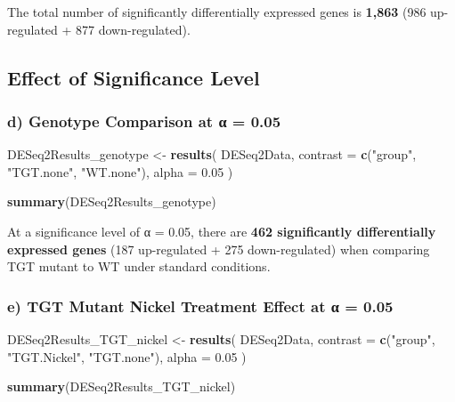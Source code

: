 \documentclass[
  11pt,
]{article}
\newenvironment{Shaded}{\begin{snugshade}}{\end{snugshade}}
\newcommand{\AttributeTok}[1]{\textcolor[rgb]{0.13,0.29,0.53}{#1}}
\newcommand{\FloatTok}[1]{\textcolor[rgb]{0.00,0.00,0.81}{#1}}
\newcommand{\FunctionTok}[1]{\textcolor[rgb]{0.13,0.29,0.53}{\textbf{#1}}}
\newcommand{\NormalTok}[1]{#1}
\newcommand{\OtherTok}[1]{\textcolor[rgb]{0.56,0.35,0.01}{#1}}
\newcommand{\StringTok}[1]{\textcolor[rgb]{0.31,0.60,0.02}{#1}}
\begin{document}
The total number of significantly differentially expressed genes is
\textbf{1,863} (986 up-regulated + 877 down-regulated).

\subsection{Effect of Significance
Level}\label{effect-of-significance-level}

\subsubsection{d) Genotype Comparison at α =
0.05}\label{d-genotype-comparison-at-ux3b1-0.05}

\begin{Shaded}
\begin{Highlighting}[]
\NormalTok{DESeq2Results\_genotype }\OtherTok{\textless{}{-}} \FunctionTok{results}\NormalTok{(}
\NormalTok{  DESeq2Data, }
  \AttributeTok{contrast =} \FunctionTok{c}\NormalTok{(}\StringTok{"group"}\NormalTok{, }\StringTok{"TGT.none"}\NormalTok{, }\StringTok{"WT.none"}\NormalTok{),}
  \AttributeTok{alpha =} \FloatTok{0.05}
\NormalTok{)}

\FunctionTok{summary}\NormalTok{(DESeq2Results\_genotype)}
\end{Highlighting}
\end{Shaded}

At a significance level of α = 0.05, there are \textbf{462 significantly
differentially expressed genes} (187 up-regulated + 275 down-regulated)
when comparing TGT mutant to WT under standard conditions.

\subsubsection{e) TGT Mutant Nickel Treatment Effect at α =
0.05}\label{e-tgt-mutant-nickel-treatment-effect-at-ux3b1-0.05}

\begin{Shaded}
\begin{Highlighting}[]
\NormalTok{DESeq2Results\_TGT\_nickel }\OtherTok{\textless{}{-}} \FunctionTok{results}\NormalTok{(}
\NormalTok{  DESeq2Data, }
  \AttributeTok{contrast =} \FunctionTok{c}\NormalTok{(}\StringTok{"group"}\NormalTok{, }\StringTok{"TGT.Nickel"}\NormalTok{, }\StringTok{"TGT.none"}\NormalTok{),}
  \AttributeTok{alpha =} \FloatTok{0.05}
\NormalTok{)}

\FunctionTok{summary}\NormalTok{(DESeq2Results\_TGT\_nickel)}
\end{Highlighting}
\end{Shaded}
\end{document}
